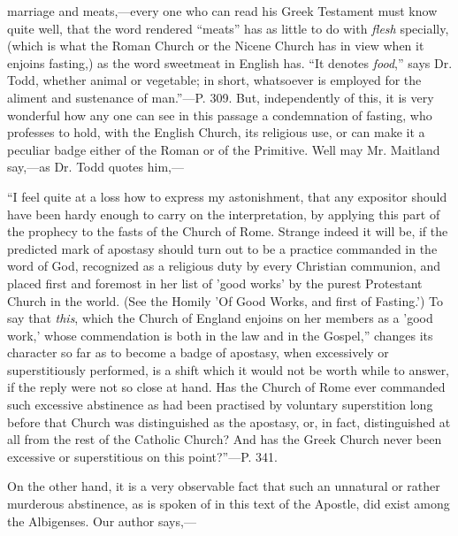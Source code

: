marriage and meats,—every one who can read his Greek Testament must
know quite well, that the word rendered ``meats'' has as
little to do with \emph{flesh} specially, (which is what the Roman
Church or the Nicene Church has in view when it enjoins fasting,) as
the word sweetmeat in English has. ``It denotes \emph{food},''
says Dr. Todd, whether animal or vegetable; in short, whatsoever is
employed for the aliment and sustenance of man.''—P. 309. But,
independently of this, it is very wonderful how any one can see in
this passage a condemnation of fasting, who professes to hold, with
the English Church, its religious use, or can make it a peculiar badge
either of the Roman or of the Primitive. Well may Mr. Maitland say,—as
Dr. Todd quotes him,—

``I feel quite at a loss how to express my astonishment, that
any expositor should have been hardy enough to carry on the
interpretation, by applying this part of the prophecy to the fasts of
the Church of Rome. Strange indeed it will be, if the predicted mark
of apostasy should turn out to be a practice commanded in the word of
God, recognized as a religious duty by every Christian communion, and
placed first and foremost in her list of 'good works' by the purest
Protestant Church in the world. (See the Homily 'Of Good Works, and
first of Fasting.') To say that \emph{this}, which the Church of
England enjoins on her members as a 'good work,'
whose commendation is both in the law and in the Gospel,'' changes
its character so far as to become a badge of apostasy, when
excessively or superstitiously performed, is a shift which it would
not be worth while to answer, if the reply were not so close at hand.
Has the Church of Rome ever commanded such excessive abstinence as had
been practised by voluntary superstition long before that Church was
distinguished as the apostasy, or, in fact, distinguished at all from
the rest of the Catholic Church? And has the Greek Church never been
excessive or superstitious on this point?''—P. 341.

On the other hand, it is a very observable fact that such an
unnatural or rather murderous abstinence, as is spoken of in this text
of the Apostle, did exist among the Albigenses. Our author says,—

